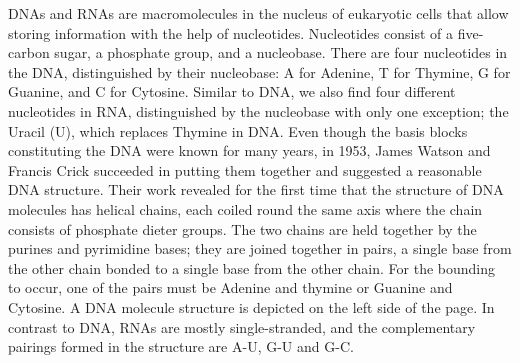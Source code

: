 DNAs and RNAs are macromolecules in the nucleus of eukaryotic cells that allow storing information with the help of nucleotides. Nucleotides consist of a five-carbon sugar, a phosphate group, and a nucleobase. There are four nucleotides in the DNA, distinguished by their nucleobase: A for Adenine, T for Thymine, G for Guanine, and C for Cytosine. Similar to DNA, we also find four different nucleotides in RNA, distinguished by the nucleobase with only one exception; the Uracil (U), which replaces Thymine in DNA. Even though the basis blocks constituting the DNA were known for many years, in 1953, James Watson and Francis Crick \cite{watson1953molecular} succeeded in putting them together and suggested a reasonable DNA structure. 
Their work revealed for the first time that the structure of DNA molecules has helical chains, each coiled round the same axis where the chain consists of phosphate dieter groups. The two chains are held together by the purines and pyrimidine bases; they are joined together in pairs, a single base from the other chain bonded to a single base from the other chain. For the bounding to occur, one of the pairs must be Adenine and thymine or Guanine and Cytosine. A DNA molecule structure is depicted on the left side of the page. In contrast to DNA, RNAs are mostly single-stranded, and the complementary pairings formed in the structure are A-U, G-U and G-C.  
